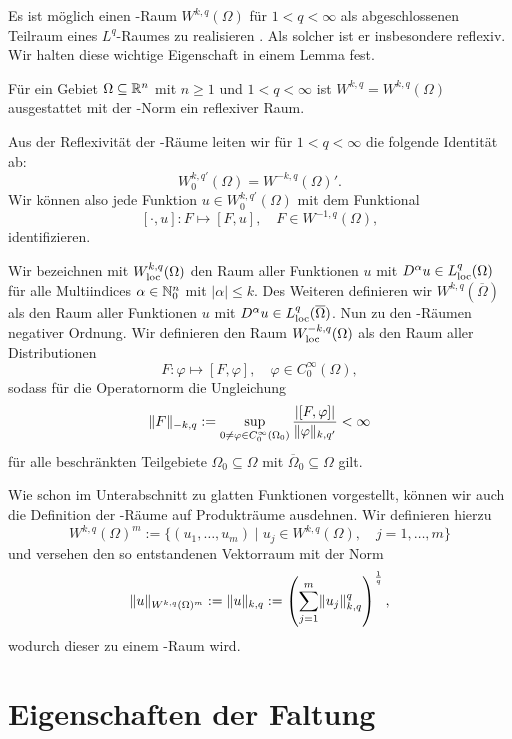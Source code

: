 Es ist möglich einen \sobolev\hyp{}Raum $W^{k,q}(\Omega)$ für $1 < q < \infty$ als abgeschlossenen Teilraum eines $L^q$\hyp{}Raumes zu realisieren \cite[S.61, 3.5]{adams2003sobolev}.
Als solcher ist er insbesondere reflexiv.
Wir halten diese wichtige Eigenschaft in einem Lemma fest.

\begin{lem}
  Für ein Gebiet $\Omega \subseteq \mathbb{R}^n$ mit $n \geq 1$ und $1 < q < \infty$ ist $W^{k,q} = W^{k,q}(\Omega)$ ausgestattet mit der \sobolev\hyp{}Norm ein reflexiver Raum.
\end{lem}

Aus der Reflexivität der \sobolev\hyp{}Räume leiten wir für $1 < q < \infty$ die folgende Identität ab:
$$
  W_0^{k,q'}(\Omega) = W^{-k,q}(\Omega)'.
$$
Wir können also jede Funktion $u \in W_0^{k,q'}(\Omega)$ mit dem Funktional
$$
[\cdot, u] \colon F \mapsto [F, u], \quad F \in W^{-1,q}(\Omega),
$$
identifizieren.

Wir bezeichnen mit $W^{k,q}_{\operatorname{loc}}(\Omega)$ den Raum aller Funktionen $u$ mit $D^\alpha u \in L^q_{\operatorname{loc}}(\Omega)$ für alle Multiindices $\alpha \in \mathbb{N}_0^n$ mit $|\alpha| \leq k$.
Des Weiteren definieren wir $W^{k,q}(\overline\Omega)$ als den Raum aller Funktionen $u$ mit $D^\alpha u \in L^q_{\operatorname{loc}}(\overline\Omega)$.
Nun zu den \sobolev\hyp{}Räumen negativer Ordnung. 
Wir definieren den Raum $W^{-k,q}_{\operatorname{loc}}(\Omega)$ als den Raum aller Distributionen
$$
F \colon \varphi \mapsto [F,\varphi], \quad \varphi \in C_0^\infty(\Omega),
$$
sodass für die Operatornorm die Ungleichung
\begin{equation}
  \label{eq:operatornorm}
\lVert F \rVert_{-k,q} := \sup_{0 \neq \varphi \in C_0^\infty(\Omega_0)}  \frac{|[F,\varphi]|}{\lVert \varphi \rVert_{k,q'}} < \infty
\end{equation}
für alle beschränkten Teilgebiete $\Omega_0 \subseteq \Omega$ mit $\overline\Omega_0 \subseteq \Omega$ gilt.

Wie schon im Unterabschnitt zu glatten Funktionen vorgestellt, können wir auch die Definition der \sobolev\hyp{}Räume auf Produkträume ausdehnen. 
Wir definieren hierzu
$$
W^{k,q}(\Omega)^m := \{ (u_1,\dots,u_m) \mid u_j \in W^{k,q}(\Omega), \quad j = 1,\dots, m\}
$$
und versehen den so entstandenen Vektorraum mit der Norm
$$
\lVert u \rVert_{W^{k,q}(\Omega)^m} 
:= \lVert u \rVert_{k,q}
:= \left( \sum_{j = 1}^m \lVert u_j \rVert_{k,q}^q \right)^{\frac{1}{q}},
$$
wodurch dieser zu einem \banach\hyp{}Raum wird.


\section{Eigenschaften der Faltung}
\label{subsec:mollification}

